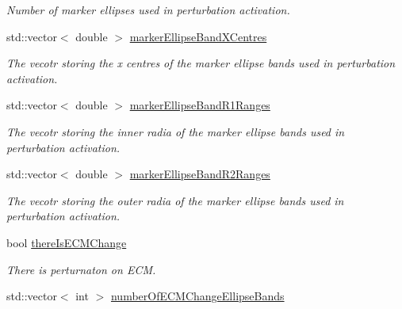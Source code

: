 \begin{DoxyCompactItemize}
\begin{DoxyCompactList}\small\item\em Number of marker ellipses used in perturbation activation. \end{DoxyCompactList}\item 
\hypertarget{classSimulation_a3495b4621a68a6698c6305f2dd9f2798}{}std\+::vector$<$ double $>$ \hyperlink{classSimulation_a3495b4621a68a6698c6305f2dd9f2798}{marker\+Ellipse\+Band\+X\+Centres}\label{classSimulation_a3495b4621a68a6698c6305f2dd9f2798}

\begin{DoxyCompactList}\small\item\em The vecotr storing the x centres of the marker ellipse bands used in perturbation activation. \end{DoxyCompactList}\item 
\hypertarget{classSimulation_a6084b215ed2b7f11bd208c25e9b1e256}{}std\+::vector$<$ double $>$ \hyperlink{classSimulation_a6084b215ed2b7f11bd208c25e9b1e256}{marker\+Ellipse\+Band\+R1\+Ranges}\label{classSimulation_a6084b215ed2b7f11bd208c25e9b1e256}

\begin{DoxyCompactList}\small\item\em The vecotr storing the inner radia of the marker ellipse bands used in perturbation activation. \end{DoxyCompactList}\item 
\hypertarget{classSimulation_a78598aabaa0ffafb153edf5dbc51aea9}{}std\+::vector$<$ double $>$ \hyperlink{classSimulation_a78598aabaa0ffafb153edf5dbc51aea9}{marker\+Ellipse\+Band\+R2\+Ranges}\label{classSimulation_a78598aabaa0ffafb153edf5dbc51aea9}

\begin{DoxyCompactList}\small\item\em The vecotr storing the outer radia of the marker ellipse bands used in perturbation activation. \end{DoxyCompactList}\item 
\hypertarget{classSimulation_aa715adde27080a9c1e52f4428070d408}{}bool \hyperlink{classSimulation_aa715adde27080a9c1e52f4428070d408}{there\+Is\+E\+C\+M\+Change}\label{classSimulation_aa715adde27080a9c1e52f4428070d408}

\begin{DoxyCompactList}\small\item\em There is perturnaton on E\+C\+M. \end{DoxyCompactList}\item 
\hypertarget{classSimulation_adc949fef766f9f71a713ea8fe88180b1}{}std\+::vector$<$ int $>$ \hyperlink{classSimulation_adc949fef766f9f71a713ea8fe88180b1}{number\+Of\+E\+C\+M\+Change\+Ellipse\+Bands}\label{classSimulation_adc949fef766f9f71a713ea8fe88180b1}


\end{DoxyCompactItemize}
